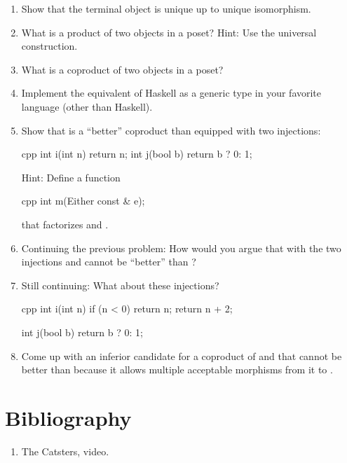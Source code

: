 \begin{enumerate}
  \tightlist
  \item
        Show that the terminal object is unique up to unique isomorphism.
  \item
        What is a product of two objects in a poset? Hint: Use the universal
        construction.
  \item
        What is a coproduct of two objects in a poset?
  \item
        Implement the equivalent of Haskell  as a generic type
        in your favorite language (other than Haskell).
  \item
        Show that  is a ``better'' coproduct than 
        equipped with two injections:

        \begin{snip}{cpp}
int i(int n) { return n; }
int j(bool b) { return b ? 0: 1; }
\end{snip}

        Hint: Define a function

        \begin{snip}{cpp}
int m(Either const & e);
\end{snip}

        that factorizes  and .
  \item
        Continuing the previous problem: How would you argue that 
        with the two injections  and  cannot be ``better''
        than ?
  \item
        Still continuing: What about these injections?

        \begin{snip}{cpp}
int i(int n) {
    if (n < 0) return n;
    return n + 2;
}

int j(bool b) { return b ? 0: 1; }
\end{snip}
  \item
        Come up with an inferior candidate for a coproduct of  and
         that cannot be better than  because it
        allows multiple acceptable morphisms from it to .
\end{enumerate}

\section{Bibliography}

\begin{enumerate}
  \tightlist
  \item
        The Catsters,
         video.
\end{enumerate}
